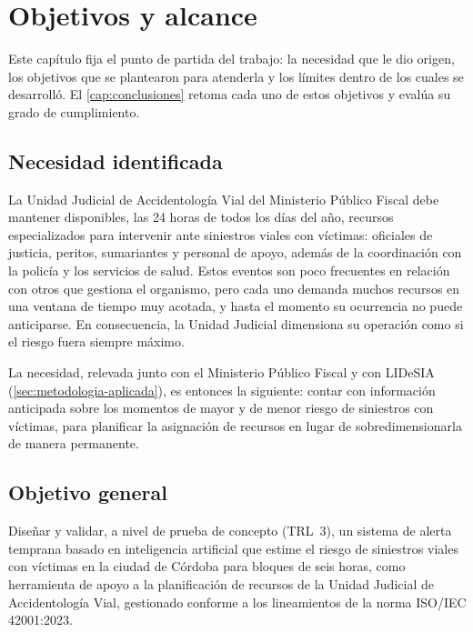 \chapter{Objetivos y alcance}\label{cap:objetivos}

Este capítulo fija el punto de partida del trabajo: la necesidad que le dio origen, los objetivos que se plantearon para atenderla y los límites dentro de los cuales se desarrolló. El \cref{cap:conclusiones} retoma cada uno de estos objetivos y evalúa su grado de cumplimiento.

\section{Necesidad identificada}\label{sec:necesidad}

La Unidad Judicial de Accidentología Vial del Ministerio Público Fiscal debe mantener disponibles, las 24 horas de todos los días del año, recursos especializados para intervenir ante siniestros viales con víctimas: oficiales de justicia, peritos, sumariantes y personal de apoyo, además de la coordinación con la policía y los servicios de salud. Estos eventos son poco frecuentes en relación con otros que gestiona el organismo, pero cada uno demanda muchos recursos en una ventana de tiempo muy acotada, y hasta el momento su ocurrencia no puede anticiparse. En consecuencia, la Unidad Judicial dimensiona su operación como si el riesgo fuera siempre máximo.

La necesidad, relevada junto con el Ministerio Público Fiscal y con LIDeSIA (\cref{sec:metodologia-aplicada}), es entonces la siguiente: contar con información anticipada sobre los momentos de mayor y de menor riesgo de siniestros con víctimas, para planificar la asignación de recursos en lugar de sobredimensionarla de manera permanente.

\section{Objetivo general}\label{sec:objetivo-general}

Diseñar y validar, a nivel de prueba de concepto (TRL~3), un sistema de alerta temprana basado en inteligencia artificial que estime el riesgo de siniestros viales con víctimas en la ciudad de Córdoba para bloques de seis horas, como herramienta de apoyo a la planificación de recursos de la Unidad Judicial de Accidentología Vial, gestionado conforme a los lineamientos de la norma ISO/IEC 42001:2023.

